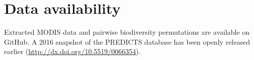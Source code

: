 \section{Data availability}
\label{C02_06}
Extracted MODIS data and pairwise biodiversity permutations are available on GitHub. A 2016 snapshot of the PREDICTS database has been openly released earlier (\href{http://dx.doi.org/10.5519/0066354}{http://dx.doi.org/10.5519/0066354}).

\clearpage
%

%  

